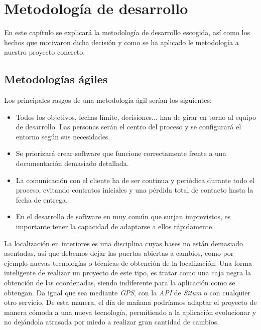\chapter{Metodología de desarrollo}
En este capítulo se explicará la metodología de desarrollo escogida, así como los hechos que motivaron dicha decisión y como se ha aplicado le metodología a nuestro proyecto concreto.
\section{Metodologías ágiles}
Los principales rasgos de una metodología ágil serían los siguientes:
\begin{itemize}
\item Todos los objetivos, fechas límite, decisiones... han de girar en torno al equipo de desarrollo. Las personas serán el centro del proceso y se configurará el entorno según sus necesidades.
\item Se priorizará crear software que funcione correctamente frente a una documentación demasiado detallada.
\item La comunicación con el cliente ha de ser continua y periódica durante todo el proceso, evitando contratos iniciales y una pérdida total de contacto hasta la fecha de entrega.
\item En el desarrollo de software en muy común que surjan imprevistos, es importante tener la capacidad de adaptarse a ellos rápidamente.
\end{itemize}
La localización en interiores es una disciplina cuyas bases no están demasiado asentadas, así que debemos dejar las puertas abiertas a cambios, como por ejemplo nuevas tecnologías o técnicas de obtención de la localización. Una forma inteligente de realizar un proyecto de este tipo, es tratar como una caja negra la obtención de las coordenadas, siendo indiferente para la aplicación como se obtengan. Da igual que sea mediante \textit{GPS}, con la \textit{API} de \textit{Situm} o con cualquier otro servicio. De esta manera, el día de mañana podríamos adaptar el proyecto de manera cómoda a una nueva tecnología, permitiendo a la aplicación evolucionar y no dejándola atrasada por miedo a realizar gran cantidad de cambios.
